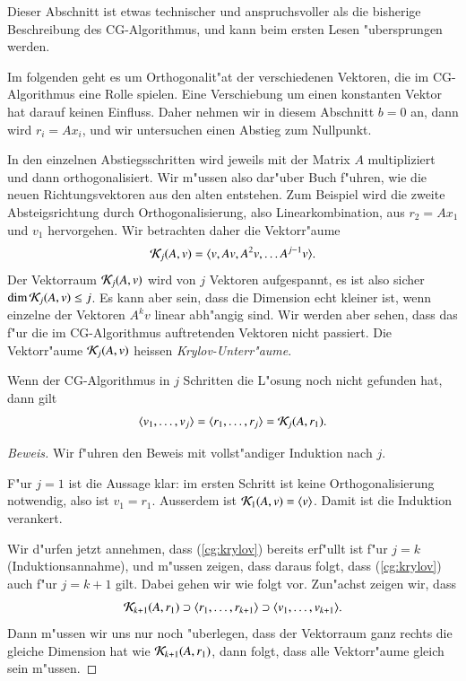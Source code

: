 Dieser Abschnitt ist etwas technischer und anspruchsvoller als die 
bisherige Beschreibung des CG-Algorithmus, und kann beim ersten Lesen
"ubersprungen werden.
\medskip

{\small

Im folgenden geht es um Orthogonalit"at der verschiedenen Vektoren, die
im CG-Algorithmus eine Rolle spielen.
Eine Verschiebung um einen konstanten Vektor hat darauf keinen Einfluss.
Daher nehmen wir in diesem Abschnitt $b=0$ an, dann wird $r_i=Ax_i$,
und wir untersuchen einen Abstieg zum Nullpunkt.

In den einzelnen Abstiegsschritten wird jeweils mit der Matrix $A$
multipliziert und dann orthogonalisiert.
Wir m"ussen also dar"uber Buch f"uhren, wie die neuen Richtungsvektoren
aus den alten entstehen.
Zum Beispiel wird die zweite Absteigsrichtung durch Orthogonalisierung, also
Linearkombination, aus 
$r_2 = Ax_1$ und $v_1$ hervorgehen.
Wir betrachten daher die Vektorr"aume
\[
{\cal K}_j(A,v)=\langle v,Av,A^2v,\dots A^{j-1}v\rangle.
\]
Der Vektorraum ${\cal K}_j(A,v)$ wird von $j$ Vektoren aufgespannt,
es ist also sicher $\operatorname{dim}{\cal K}_j(A,v)\le j$.
Es kann aber sein, dass die Dimension echt kleiner ist, wenn einzelne
der Vektoren $A^kv$ linear abh"angig sind. Wir werden aber sehen, dass
das f"ur die im CG-Algorithmus auftretenden Vektoren nicht passiert.
Die Vektorr"aume ${\cal K}_j(A,v)$ heissen {\em Krylov-Unterr"aume}.

\begin{satz}
\label{cg:krylovsatz}
Wenn der CG-Algorithmus in $j$ Schritten die L"osung noch nicht gefunden
hat, dann gilt
\begin{equation}
\langle v_1,\dots,v_j\rangle = \langle r_1,\dots,r_j\rangle
= {\cal K}_j(A,r_1).
\label{cg:krylov}
\end{equation}
\end{satz}

\begin{proof}[Beweis]
Wir f"uhren den Beweis mit vollst"andiger Induktion nach $j$.

F"ur $j=1$ ist die Aussage klar: im ersten Schritt ist keine
Orthogonalisierung notwendig, also ist $v_1=r_1$. 
Ausserdem ist ${\cal K}_1(A,v)=\langle v\rangle$.
Damit ist die Induktion verankert.

Wir d"urfen jetzt annehmen, dass (\ref{cg:krylov}) bereits erf"ullt ist
f"ur $j=k$ (Induktionsannahme), und m"ussen zeigen, dass daraus folgt,
dass (\ref{cg:krylov}) auch f"ur $j=k+1$ gilt. Dabei gehen wir wie folgt
vor. Zun"achst zeigen wir, dass
\begin{equation}
{\cal K}_{k+1}(A,r_1)
\supset
\langle r_1,\dots,r_{k+1}\rangle
\supset 
\langle v_1,\dots,v_{k+1}\rangle.
\label{cg:inclusions}
\end{equation}
Dann m"ussen wir uns nur noch "uberlegen, dass der Vektorraum ganz rechts
die gleiche Dimension hat wie ${\cal K}_{k+1}(A,r_1)$, dann folgt, dass
alle Vektorr"aume gleich sein m"ussen.


\end{proof}}
